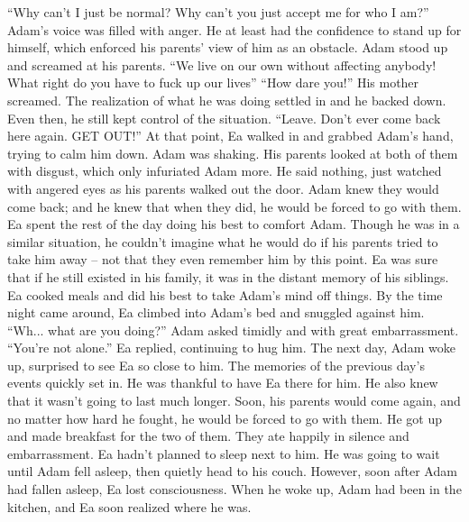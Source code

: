 \documentclass[openany, 12pt]{book}
\newcommand\tab[1][1cm]{\hspace*{#1}}
\begin{document}
\begin{itshape}
\newline
\tab
``Why can’t I just be normal? Why can’t you just accept me for who I am?'' Adam’s voice was filled with anger. He at least had the confidence to stand up for himself, which enforced his parents’ view of him as an obstacle. Adam stood up and screamed at his parents. ``We live on our own without affecting anybody! What right do you have to fuck up our lives\textinterrobang''
\newline
\tab
``How dare you!'' His mother screamed. The realization of what he was doing settled in and he backed down. Even then, he still kept control of the situation.
\newline
\tab
``Leave. Don’t ever come back here again. GET OUT!'' At that point, Ea walked in and grabbed Adam’s hand, trying to calm him down. Adam was shaking.
\newline
\tab
His parents looked at both of them with disgust, which only infuriated Adam more. He said nothing, just watched with angered eyes as his parents walked out the door. Adam knew they would come back; and he knew that when they did, he would be forced to go with them.
\newline
\tab
Ea spent the rest of the day doing his best to comfort Adam. Though he was in a similar situation, he couldn’t imagine what he would do if his parents tried to take him away -- not that they even remember him by this point. Ea was sure that if he still existed in his family, it was in the distant memory of his siblings.
\newline
\tab
Ea cooked meals and did his best to take Adam’s mind off things. By the time night came around, Ea climbed into Adam’s bed and snuggled against him. ``Wh... what are you doing?'' Adam asked timidly and with great embarrassment.
\newline
\tab
``You’re not alone.'' Ea replied, continuing to hug him.
\newline
\tab
The next day, Adam woke up, surprised to see Ea so close to him. The memories of the previous day’s events quickly set in. He was thankful to have Ea there for him. He also knew that it wasn’t going to last much longer. Soon, his parents would come again, and no matter how hard he fought, he would be forced to go with them.
\newline
\tab
He got up and made breakfast for the two of them. They ate happily in silence and embarrassment. Ea hadn’t planned to sleep next to him. He was going to wait until Adam fell asleep, then quietly head to his couch. However, soon after Adam had fallen asleep, Ea lost consciousness. When he woke up, Adam had been in the kitchen, and Ea soon realized where he was. 

\end{itshape}
\end{document}
